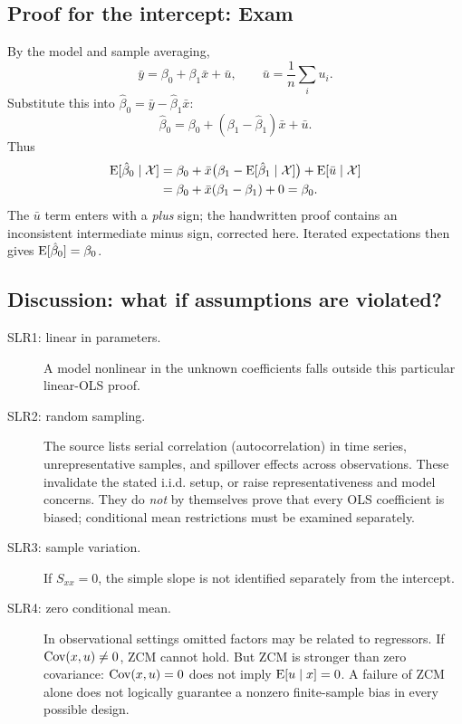 \subsection{Proof for the intercept: Exam}
\label{sec:intercept-proof}
By the model and sample averaging,
\[\bar y=\beta_0+\beta_1\bar x+\bar u,\qquad
\bar u=\frac1n\sum_i u_i.\]
Substitute this into $\hat\beta_0=\bar y-\hat\beta_1\bar x$:
\[\hat\beta_0=\beta_0+(\beta_1-\hat\beta_1)\bar x+\bar u.\]
Thus
\begin{align*}
\operatorname{E}[\hat\beta_0\mid\mathcal X]
&=\beta_0+\bar x\bigl(\beta_1-\operatorname{E}[\hat\beta_1\mid\mathcal X]\bigr)
+\operatorname{E}[\bar u\mid\mathcal X]\\
&=\beta_0+\bar x(\beta_1-\beta_1)+0=\beta_0.
\end{align*}
The $\bar u$ term enters with a \emph{plus} sign; the handwritten proof contains an inconsistent intermediate minus sign, corrected here.
Iterated expectations then gives $\operatorname{E}[\hat\beta_0]=\beta_0$.

\subsection{Discussion: what if assumptions are violated?}
\begin{description}
\item[SLR1: linear in parameters.] A model nonlinear in the unknown coefficients falls outside this particular linear-OLS proof. 
\item[SLR2: random sampling.] The source lists serial correlation (autocorrelation) in time series, unrepresentative samples, and spillover effects across observations. These invalidate the stated i.i.d. setup, or raise representativeness and model concerns. They do \emph{not} by themselves prove that every OLS coefficient is biased; conditional mean restrictions must be examined separately.
\item[SLR3: sample variation.] If $S_{xx}=0$, the simple slope is not identified separately from the intercept.
\item[SLR4: zero conditional mean.] In observational settings omitted factors may be related to regressors. If $\operatorname{Cov}(x,u)\ne0$, ZCM cannot hold. But ZCM is stronger than zero covariance: $\operatorname{Cov}(x,u)=0$ does not imply $\operatorname{E}[u\mid x]=0$. A failure of ZCM alone does not logically guarantee a nonzero finite-sample bias in every possible design.
\end{description}

